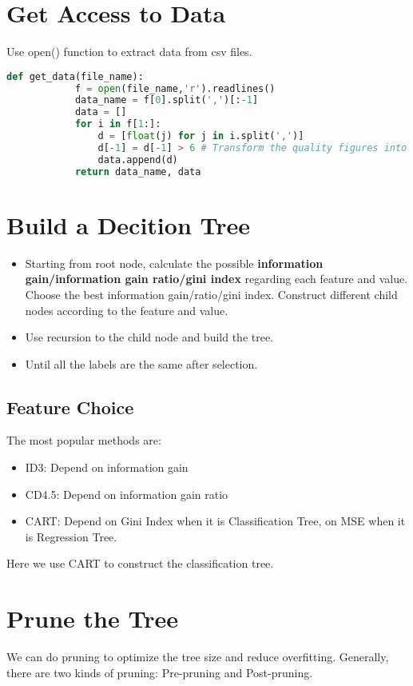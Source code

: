 \documentclass[50pt]{article}
\begin{document}
\section{Get Access to Data}
     Use open() function to extract data from csv files.
     \begin{lstlisting}[language={python}]
        def get_data(file_name):
            f = open(file_name,'r').readlines()
            data_name = f[0].split(',')[:-1]
            data = []
            for i in f[1:]:
                d = [float(j) for j in i.split(',')]
                d[-1] = d[-1] > 6 # Transform the quality figures into True or False
                data.append(d)
            return data_name, data
     \end{lstlisting}
\section{Build a Decition Tree}
\begin{itemize}
    \item Starting from root node, calculate the possible \textbf{information gain/information gain
    ratio/gini index} regarding each feature
    and value. Choose the best information gain/ratio/gini index. Construct different child nodes according to 
    the feature and value.
    \item Use recursion to the child node and build the tree.
    \item Until all the labels are the same after selection.
\end{itemize}
\subsection{Feature Choice}
The most popular methods are:
\begin{itemize}
    \item ID3: Depend on information gain
    \item CD4.5: Depend on information gain ratio
    \item CART: Depend on Gini Index when it is Classification Tree, on MSE when it is Regression Tree.
\end{itemize}
    Here we use CART to construct the classification tree.
\section{Prune the Tree}
We can do pruning to optimize the tree size and reduce overfitting. Generally, there are two kinds of pruning: Pre-pruning and Post-pruning. 
\end{document}
